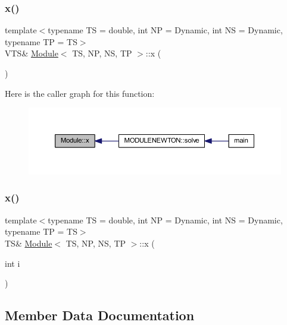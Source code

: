 \subsubsection{\texorpdfstring{x()}{x()}\hspace{0.1cm}{\footnotesize\ttfamily [1/2]}}
{\footnotesize\ttfamily template$<$typename TS = double, int NP = Dynamic, int NS = Dynamic, typename TP = TS$>$ \\
V\+TS\& \mbox{\hyperlink{class_module}{Module}}$<$ TS, NP, NS, TP $>$\+::x (\begin{DoxyParamCaption}{ }\end{DoxyParamCaption})\hspace{0.3cm}{\ttfamily [inline]}}

Here is the caller graph for this function\+:
\nopagebreak
\begin{figure}[H]
\begin{center}
\leavevmode
\includegraphics[width=350pt]{class_module_a923f4a0593063f6df53e165cc1db4891_icgraph}
\end{center}
\end{figure}
\mbox{\label{class_module_a3f448820efd272b2812e0ccc697c42de}} 
\subsubsection{\texorpdfstring{x()}{x()}\hspace{0.1cm}{\footnotesize\ttfamily [2/2]}}
{\footnotesize\ttfamily template$<$typename TS = double, int NP = Dynamic, int NS = Dynamic, typename TP = TS$>$ \\
TS\& \mbox{\hyperlink{class_module}{Module}}$<$ TS, NP, NS, TP $>$\+::x (\begin{DoxyParamCaption}\item[{int}]{i }\end{DoxyParamCaption})\hspace{0.3cm}{\ttfamily [inline]}}



\subsection{Member Data Documentation}
\mbox{\label{class_module_a518d0262a48d4bc3647adddefd66897d}} 
